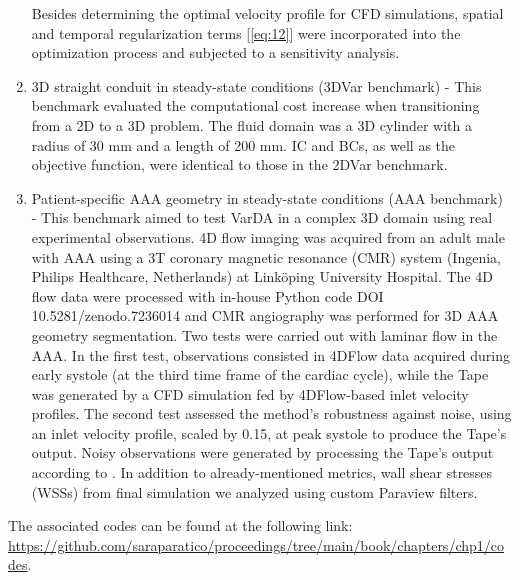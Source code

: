\begin{enumerate}
Besides determining the optimal velocity profile for CFD simulations, spatial and temporal regularization terms [\cref{eq:12}] were incorporated into the optimization process and subjected to a sensitivity analysis.\\
    \item 3D straight conduit in steady-state conditions (3DVar benchmark) - This benchmark evaluated the computational cost increase when transitioning from a 2D to a 3D problem. The fluid domain was a 3D cylinder with a radius of 30 mm and a length of 200 mm. IC and BCs, as well as the objective function, were identical to those in the 2DVar benchmark.\\
    \item Patient-specific AAA geometry in steady-state conditions (AAA benchmark) - This benchmark aimed to test VarDA in a complex 3D domain using real experimental observations. 4D flow imaging was acquired from an adult male with AAA using a 3T coronary magnetic resonance (CMR) system (Ingenia, Philips Healthcare, Netherlands) at Linköping University Hospital. The 4D flow data were processed with in-house Python code DOI 10.5281/zenodo.7236014 \cite{Saitta2024} and CMR angiography was performed for 3D AAA geometry segmentation.
Two tests were carried out with laminar flow in the AAA. In the first test, observations consisted in 4DFlow data acquired during early systole (at the third time frame of the cardiac cycle), while the Tape was generated by a CFD simulation fed by 4DFlow-based inlet velocity profiles. The second test assessed the method's robustness against noise, using an inlet velocity profile, scaled by 0.15, at peak systole to produce the Tape's output. Noisy observations were generated by processing the Tape's output according to \cite{Saitta2024}.
In addition to already-mentioned metrics, wall shear stresses (WSSs) from final simulation we analyzed using custom Paraview filters.
\end{enumerate}

The associated codes can be found at the following link:
\url{https://github.com/saraparatico/proceedings/tree/main/book/chapters/chp1/codes}.


